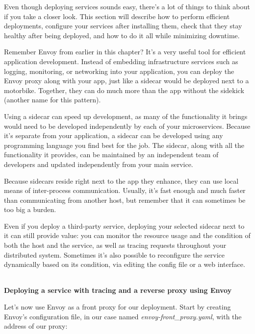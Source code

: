 

Even though deploying services sounds easy, there's a lot of things to think about if you take a closer look. This section will describe how to perform efficient deployments, configure your services after installing them, check that they stay healthy after being deployed, and how to do it all while minimizing downtime.


Remember Envoy from earlier in this chapter? It's a very useful tool for efficient application development. Instead of embedding infrastructure services such as logging, monitoring, or networking into your application, you can deploy the Envoy proxy along with your app, just like a sidecar would be deployed next to a motorbike. Together, they can do much more than the app without the sidekick (another name for this pattern).

Using a sidecar can speed up development, as many of the functionality it brings would need to be developed independently by each of your microservices. Because it's separate from your application, a sidecar can be developed using any programming language you find best for the job. The sidecar, along with all the functionality it provides, can be maintained by an independent team of developers and updated independently from your main service.

Because sidecars reside right next to the app they enhance, they can use local means of inter-process communication. Usually, it's fast enough and much faster than communicating from another host, but remember that it can sometimes be too big a burden.

Even if you deploy a third-party service, deploying your selected sidecar next to it can still provide value: you can monitor the resource usage and the condition of both the host and the service, as well as tracing requests throughout your distributed system. Sometimes it's also possible to reconfigure the service dynamically based on its condition, via editing the config file or a web interface.


\hspace*{\fill} \\ %
\noindent
\textbf{Deploying a service with tracing and a reverse proxy using Envoy}

Let's now use Envoy as a front proxy for our deployment. Start by creating Envoy's configuration file, in our case named \textit{envoy-front\_proxy.yaml}, with the address of our proxy:


